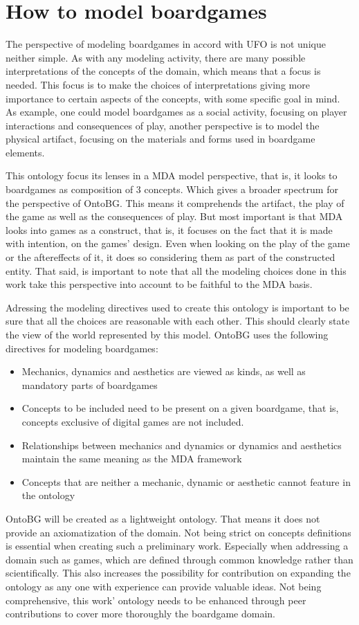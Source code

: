 \section{How to model boardgames} 

The perspective of modeling boardgames in accord with UFO is not unique neither simple. As with any modeling activity, there are many possible interpretations of the concepts of the domain, which means that a focus is needed. This focus is to make the choices of interpretations giving more importance to certain aspects of the concepts, with some specific goal in mind. As example, one could model boardgames as a social activity, focusing on player interactions and consequences of play, another perspective is to model the physical artifact, focusing on the materials and forms used in boardgame elements.

This ontology focus its lenses in a MDA model perspective, that is, it looks to boardgames as composition of 3 concepts. Which gives a broader spectrum for the perspective of OntoBG. This means it comprehends the artifact, the play of the game as well as the consequences of play. But most important is that MDA looks into games as a construct, that is, it focuses on the fact that it is made with intention, on the games' design. Even when looking on the play of the game or the aftereffects of it, it does so considering them as part of the constructed entity. That said, is important to note that all the modeling choices done in this work take this perspective into account to be faithful to the MDA basis. 

Adressing the modeling directives used to create this ontology is important to be sure that all the choices are reasonable with each other. This should clearly state the view of the world represented by this model. OntoBG uses the following directives for modeling boardgames:

\begin{itemize}
    \item Mechanics, dynamics and aesthetics are viewed as kinds, as well as mandatory parts of boardgames
    \item Concepts to be included need to be present on a given boardgame, that is, concepts exclusive of digital games are not included.
    \item Relationships between mechanics and dynamics or dynamics and aesthetics maintain the same meaning as the MDA framework
    \item Concepts that are neither a mechanic, dynamic or aesthetic cannot feature in the ontology
\end{itemize}

OntoBG will be created as a lightweight ontology. That means it does not provide an axiomatization of the domain. Not being strict on concepts definitions is essential when creating such a preliminary work. Especially when addressing a domain such as games, which are defined through common knowledge rather than scientifically. This also increases the possibility for contribution on expanding the ontology as any one with experience can provide valuable ideas. Not being comprehensive, this work' ontology needs to be enhanced through peer contributions to cover more thoroughly the boardgame domain.
